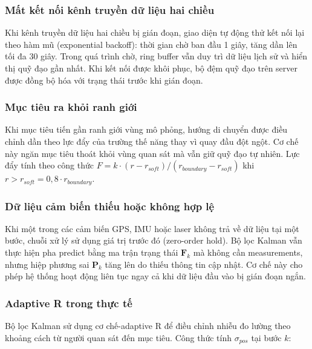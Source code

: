 \subsubsection{Mất kết nối kênh truyền dữ liệu hai chiều}

\hspace{0.5cm} Khi kênh truyền dữ liệu hai chiều bị gián đoạn, giao diện tự động thử kết nối lại theo hàm mũ (exponential backoff): thời gian chờ ban đầu 1 giây, tăng dần lên tối đa 30 giây. Trong quá trình chờ, ring buffer vẫn duy trì dữ liệu lịch sử và hiển thị quỹ đạo gần nhất. Khi kết nối được khôi phục, bộ đệm quỹ đạo trên server được đồng bộ hóa với trạng thái trước khi gián đoạn.

\subsubsection{Mục tiêu ra khỏi ranh giới}

\hspace{0.5cm} Khi mục tiêu tiến gần ranh giới vùng mô phỏng, hướng di chuyển được điều chỉnh dần theo lực đẩy của trường thế năng thay vì quay đầu đột ngột. Cơ chế này ngăn mục tiêu thoát khỏi vùng quan sát mà vẫn giữ quỹ đạo tự nhiên. Lực đẩy tính theo công thức $F = k \cdot (r - r_{soft}) / (r_{boundary} - r_{soft})$ khi $r > r_{soft} = 0,8 \cdot r_{boundary}$.

\subsubsection{Dữ liệu cảm biến thiếu hoặc không hợp lệ}

\hspace{0.5cm} Khi một trong các cảm biến GPS, IMU hoặc laser không trả về dữ liệu tại một bước, chuỗi xử lý sử dụng giá trị trước đó (zero-order hold). Bộ lọc Kalman vẫn thực hiện pha predict bằng ma trận trạng thái $\mathbf{F}_k$ mà không cần measurements, nhưng hiệp phương sai $\mathbf{P}_k$ tăng lên do thiếu thông tin cập nhật. Cơ chế này cho phép hệ thống hoạt động liên tục ngay cả khi dữ liệu đầu vào bị gián đoạn ngắn.

\subsubsection{Adaptive R trong thực tế}

\hspace{0.5cm} Bộ lọc Kalman sử dụng cơ chế-adaptive R để điều chỉnh nhiễu đo lường theo khoảng cách từ người quan sát đến mục tiêu. Công thức tính $\sigma_{pos}$ tại bước $k$:


